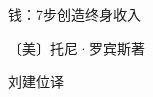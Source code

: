\thispagestyle{empty}
\vspace*{3em}
\begin{center}
  {\xbsong{}钱：7步创造终身收入\par}
  \vspace{4em}
  {\kaishu〔美〕托尼·罗宾斯\q 著\par}
  \vspace{0.8em}
  {\kaishu 刘建位\q 译\par}
\end{center}
\cleardoublepage

